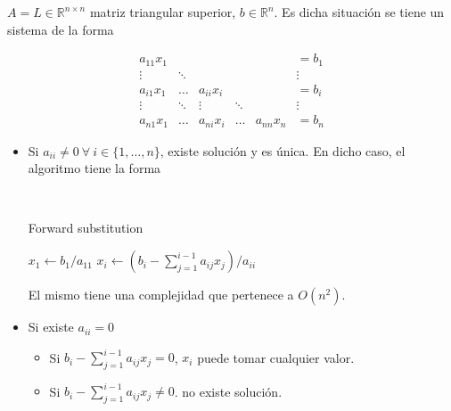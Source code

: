 $A = L \in \mathbb{R}^{n \times n}$ matriz triangular superior, $b \in \mathbb{R}^{n}$. Es dicha situación se tiene un sistema de la forma

\[
\begin{matrix}
a_{11}x_{1} &  &  &  &   & = b_1 \\
\vdots &  \ddots & &  &  & \vdots \\
a_{i1}x_{1} & \ldots & a_{ii}x_{i} & & & = b_{i} \\
\vdots & \ddots & \vdots & \ddots& & \vdots \\
a_{n1}x_{1} & \ldots &  a_{ni}x_i & \ldots & a_{nn}x_n & = b_n
\end{matrix}
\]

\begin{itemize}
    \item Si $a_{ii} \neq 0 ~\forall~ i \in \{1,\ldots,n\}$, existe solución y es única. En dicho caso, el algoritmo tiene la forma
    
    \
    \begin{algorithm}
    \begin{algorithmic}
    \caption{Forward substitution}
    \label{alg:forward_substitution}
    \State $x_1 \gets b_1/a_11 $
        \State $x_i \gets (b_i - \sum_{j=1}^{i-1} a_{ij}x_j)/a_{ii}$
    \EndFor
    \end{algorithmic}
    \end{algorithm}
    
    El mismo tiene una complejidad que pertenece a $O(n^2)$.
    
    \item Si existe $a_{ii} = 0$
    \begin{itemize}
        \item Si $b_i - \sum_{j=1}^{i-1} a_{ij}x_j = 0$, $x_i$ puede tomar cualquier valor.
        \item Si $b_i - \sum_{j=1}^{i-1} a_{ij}x_j \neq 0$. no existe solución.
    \end{itemize}
\end{itemize}
